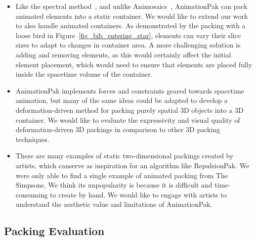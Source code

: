 \begin{itemize}
\item {}
Like the spectral method~\cite{Dalal2006}, and unlike
	Animosaics~\cite{Smith2005}, AnimationPak can pack animated 
	elements into a static container.  We would like to extend
	our work to also handle animated containers. 
	\newtext
	{
	As demonstrated by the packing with a loose bird in Figure~\ref{fig_bib_entering_star},
	elements can vary their slice sizes to adapt to changes in container area.
	A more challenging solution is adding and removing elements,
	as this would certainly affect the initial element placement, which 
	would need to ensure that elements are placed fully inside the
	spacetime volume of the container.  		
	}

\item {}
AnimationPak implements forces and constraints geared towards 
	spacetime animation, but many of the same ideas could be adapted
	to develop a deformation-driven method for packing purely spatial
	3D objects into a 3D container.  We would like to evaluate the
	expressivity and visual quality of deformation-driven 3D packings 
	in comparison to other 3D packing techniques.

\item {}
There are many examples of static two-dimensional packings
	created by artists, which canserve as inspiration for an algorithm like RepulsionPak.  
	We were only able to find a single example of animated packing from The Simpsons, 
	We think its unpopularity is because it is difficult and time-consuming to create by hand.
	We would like 	to engage with artists to understand the aesthetic value and limitations
	of AnimationPak.

\end{itemize}

\subsection{Packing Evaluation}

